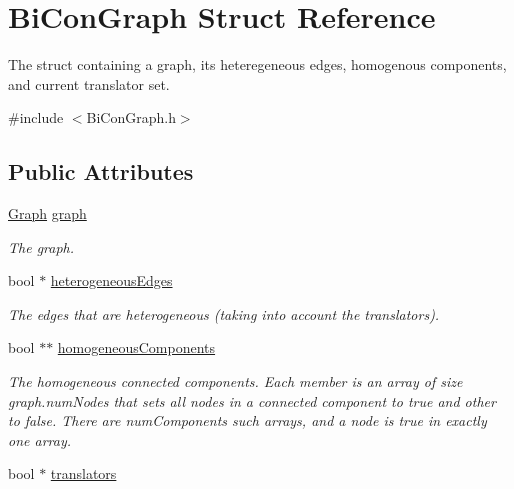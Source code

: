 \hypertarget{structBiConGraph}{}\section{Bi\+Con\+Graph Struct Reference}
\label{structBiConGraph}


The struct containing a graph, its heteregeneous edges, homogenous components, and current translator set.  




{\ttfamily \#include $<$Bi\+Con\+Graph.\+h$>$}

\subsection*{Public Attributes}
\begin{DoxyCompactItemize}
\item 
\hyperlink{structGraph}{Graph} \hyperlink{structBiConGraph_a6e6dd2faccdfa16fce565b126ba40804}{graph}\hypertarget{structBiConGraph_a6e6dd2faccdfa16fce565b126ba40804}{}\label{structBiConGraph_a6e6dd2faccdfa16fce565b126ba40804}

\begin{DoxyCompactList}\small\item\em The graph. \end{DoxyCompactList}\item 
bool $\ast$ \hyperlink{structBiConGraph_a37b0d5cb9db5516e27d7940f236c1663}{heterogeneous\+Edges}\hypertarget{structBiConGraph_a37b0d5cb9db5516e27d7940f236c1663}{}\label{structBiConGraph_a37b0d5cb9db5516e27d7940f236c1663}

\begin{DoxyCompactList}\small\item\em The edges that are heterogeneous (taking into account the translators). \end{DoxyCompactList}\item 
bool $\ast$$\ast$ \hyperlink{structBiConGraph_a175e31bc5f0e497829b04165a2b057b5}{homogeneous\+Components}\hypertarget{structBiConGraph_a175e31bc5f0e497829b04165a2b057b5}{}\label{structBiConGraph_a175e31bc5f0e497829b04165a2b057b5}

\begin{DoxyCompactList}\small\item\em The homogeneous connected components. Each member is an array of size {\ttfamily graph.\+num\+Nodes} that sets all nodes in a connected component to true and other to false. There are {\ttfamily num\+Components} such arrays, and a node is true in exactly one array. \end{DoxyCompactList}\item 
bool $\ast$ \hyperlink{structBiConGraph_af9549214f0f2b873d5a26d5af5f1d28a}{translators}\hypertarget{structBiConGraph_af9549214f0f2b873d5a26d5af5f1d28a}{}\label{structBiConGraph_af9549214f0f2b873d5a26d5af5f1d28a}


\end{DoxyCompactItemize}
